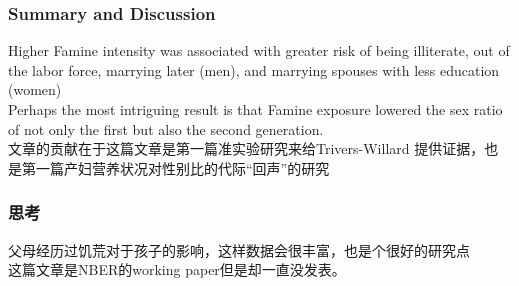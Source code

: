 \documentclass{beamer}
\begin{document}
\begin{frame}
    \frametitle{Summary and Discussion}
Higher Famine intensity was associated with greater risk of being illiterate, out of the labor force, marrying later (men), and marrying spouses with less education (women)
\\ Perhaps the most intriguing result is that Famine exposure lowered the sex ratio of not only the ﬁrst but also the second generation.
\\ 文章的贡献在于这篇文章是第一篇准实验研究来给Trivers-Willard 提供证据，也是第一篇产妇营养状况对性别比的代际“回声”的研究
\end{frame}

\begin{frame}
	\frametitle{思考}
	父母经历过饥荒对于孩子的影响，这样数据会很丰富，也是个很好的研究点
	\\这篇文章是NBER的working paper但是却一直没发表。
\end{frame}
\end{document}
